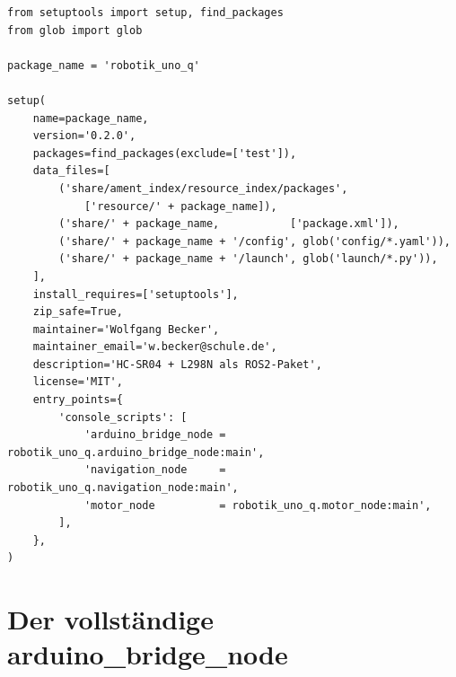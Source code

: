 \begin{lstlisting}
from setuptools import setup, find_packages
from glob import glob

package_name = 'robotik_uno_q'

setup(
    name=package_name,
    version='0.2.0',
    packages=find_packages(exclude=['test']),
    data_files=[
        ('share/ament_index/resource_index/packages',
            ['resource/' + package_name]),
        ('share/' + package_name,           ['package.xml']),
        ('share/' + package_name + '/config', glob('config/*.yaml')),
        ('share/' + package_name + '/launch', glob('launch/*.py')),
    ],
    install_requires=['setuptools'],
    zip_safe=True,
    maintainer='Wolfgang Becker',
    maintainer_email='w.becker@schule.de',
    description='HC-SR04 + L298N als ROS2-Paket',
    license='MIT',
    entry_points={
        'console_scripts': [
            'arduino_bridge_node = robotik_uno_q.arduino_bridge_node:main',
            'navigation_node     = robotik_uno_q.navigation_node:main',
            'motor_node          = robotik_uno_q.motor_node:main',
        ],
    },
)
\end{lstlisting}

\section{Der vollständige arduino\_bridge\_node}

